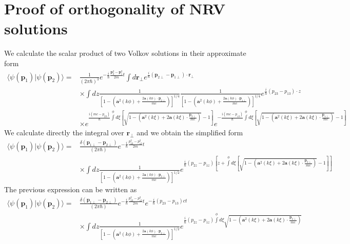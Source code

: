 
\chapter{Proof of orthogonality of NRV solutions}
We calculate the scalar product of two Volkov solutions in their approximate form
\begin{align}
    \langle\psi({\bm p}_1)|\psi({\bm p}_2)\rangle = & \frac1{(2\pi\hbar)^3}e^{-\frac{i}{\hbar}\frac{{\bm p}_2^2-{\bm p}_1^2}{2m}t}\int d{\bm r}_\perp e^{\frac{i}{\hbar}{({\bm p}_{2\perp}-{\bm p}_{1\perp})\cdot{\bm r}_\perp}}\nonumber                                                                                                                                \\
                                                    & \times\int dz\frac1{\left[1-\left({\bm a}^2(k\phi)+\frac{2{\bm a}(k\phi)\cdot{\bm p}_{2\perp}}{mc}\right)\right]^{1/4}}\frac1{\left[1-\left({\bm a}^2(k\phi)+\frac{2{\bm a}(k\phi)\cdot{\bm p}_{1\perp}}{mc}\right)\right]^{1/4}}e^{\frac{i}{\hbar}(p_{23}-p_{13})\cdot{ z}}\nonumber                              \\
                                                    & \times e^{\frac{i(mc-p_{23})}{\hbar}\int\limits^{\phi}d\xi\left[\sqrt{1-\left({\bm a}^2(k\xi)+2{\bm a}(k\xi)\cdot\frac{\bm p_{2\perp}}{mc}\right)}-1\right]}e^{-\frac{i(mc-p_{13})}{\hbar}\int\limits^{\phi}d\xi\left[\sqrt{1-\left({\bm a}^2(k\xi)+2{\bm a}(k\xi)\cdot\frac{\bm p_{1\perp}}{mc}\right)}-1\right]}
\end{align}
We calculate directly the integral over ${\bm r}_\perp$ and we obtain the simplified form
\begin{align}
    \langle\psi({\bm p}_1)|\psi({\bm p}_2)\rangle = & \frac{\delta({\bm p}_{1\perp}-{\bm p}_{2\perp})}{(2\pi\hbar)}e^{-\frac{i}{\hbar}\frac{ p_{23}^2-{ p}_{13}^2}{2m}t}\nonumber                                                                                                                                                                        \\
                                                    & \times\int dz\frac1{\left[1-\left({\bm a}^2(k\phi)+\frac{2{\bm a}(k\phi)\cdot{\bm p}_{2\perp}}{mc}\right)\right]^{1/2}}e^{\frac{i}{\hbar}(p_{2z}-p_{1z})\left[{ z}+\int\limits^{\phi}d\xi\left[\sqrt{1-\left({\bm a}^2(k\xi)+2{\bm a}(k\xi)\cdot\frac{\bm p_{2\perp}}{mc}\right)}-1\right]\right]}
\end{align}
The previous expression can be written as
\begin{align}
    \langle\psi({\bm p}_1)|\psi({\bm p}_2)\rangle = & \frac{\delta({\bm p}_{1\perp}-{\bm p}_{2\perp})}{(2\pi\hbar)}e^{-\frac{i}{\hbar}\frac{ p_{23}^2-{ p}_{13}^2}{2m}t}e^{-\frac{i}{\hbar}{( p_{23}-{ p}_{13})}ct}\nonumber                                                                                            \\
                                                    & \times\int dz\frac1{\left[1-\left({\bm a}^2(k\phi)+\frac{2{\bm a}(k\phi)\cdot{\bm p}_{2\perp}}{mc}\right)\right]^{1/2}}e^{\frac{i}{\hbar}(p_{2z}-p_{1z})\int\limits^{\phi}d\xi\sqrt{1-\left({\bm a}^2(k\xi)+2{\bm a}(k\xi)\cdot\frac{\bm p_{2\perp}}{mc}\right)}}
\end{align}
